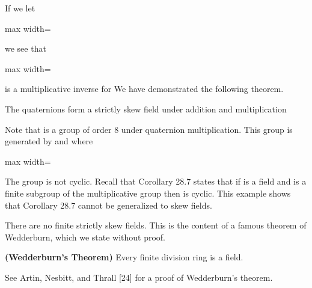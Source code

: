 \documentclass[11pt,oneside]{article}
\begin{document}
\begin{BookBody}
\noindent If we let

\begin{center}\begin{adjustbox}{max width=\linewidth}\end{adjustbox}\end{center}

\noindent we see that

\begin{center}\begin{adjustbox}{max width=\linewidth}\end{adjustbox}\end{center}

\noindent is a multiplicative inverse for  We have demonstrated the following theorem.

 The quaternions  form a strictly skew field under addition and multiplication\BookEnd{\blacklozenge}

Note that  is a group of order 8 under quaternion multiplication. This group is generated by  and  where

\begin{center}\begin{adjustbox}{max width=\linewidth}\end{adjustbox}\end{center}

\noindent The group  is not cyclic. Recall that Corollary 28.7 states that if  is a field and  is a finite subgroup of the multiplicative group  then  is cyclic. This example shows that Corollary 28.7 cannot be generalized to skew fields.

There are no finite strictly skew fields. This is the content of a famous theorem of Wedderburn, which we state without proof.

 \textbf{(Wedderburn’s Theorem)} Every finite division ring is a field.

 See Artin, Nesbitt, and Thrall [24] for a proof of Wedderburn’s theorem. \BookEnd{\blacklozenge}

\end{BookBody}
\end{document}
